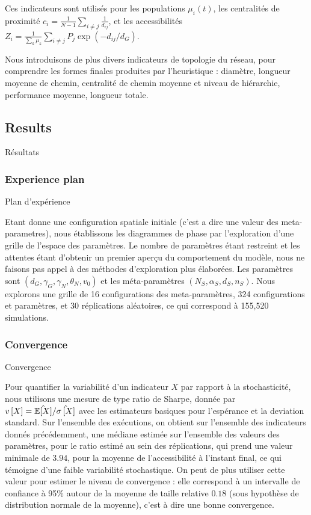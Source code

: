 Ces indicateurs sont utilisés pour les populations $\mu_i(t)$, les centralités de proximité $c_i = \frac{1}{N-1}\sum_{i\neq j} \frac{1}{d_{ij}}$, et les accessibilités $Z_i = \frac{1}{\sum_k \mu_k}\sum_{i\neq j} P_j \exp{\left(- d_{ij}/d_G\right)}$.



Nous introduisons de plus divers indicateurs de topologie du réseau, pour comprendre les formes finales produites par l'heuristique : diamètre, longueur moyenne de chemin, centralité de chemin moyenne et niveau de hiérarchie, performance moyenne, longueur totale.




\subsection{Results}{Résultats}


\subsubsection{Experience plan}{Plan d'expérience}

Etant donne une configuration spatiale initiale (c'est a dire une valeur des meta-parametres), nous établissons les diagrammes de phase par l'exploration d'une grille de l'espace des paramètres. Le nombre de paramètres étant restreint et les attentes étant d'obtenir un premier aperçu du comportement du modèle, nous ne faisons pas appel à des méthodes d'exploration plus élaborées. Les paramètres sont $(d_G,\gamma_G,\gamma_N,\theta_N,v_0)$ et les méta-paramètres $(N_S,\alpha_S,d_S,n_S)$. Nous explorons une grille de 16 configurations des meta-paramètres, 324 configurations et paramètres, et 30 réplications aléatoires, ce qui correspond à 155,520 simulations.



\subsubsection{Convergence}{Convergence}


Pour quantifier la variabilité d'un indicateur $X$ par rapport à la stochasticité, nous utilisons une mesure de type ratio de Sharpe, donnée par $v\left[X\right] = \hat{\operatorname{\mathbb{E}}\!\left[X\right]}/\hat{\sigma\left[X\right]}$ avec les estimateurs basiques pour l'espérance et la deviation standard. Sur l'ensemble des exécutions, on obtient sur l'ensemble des indicateurs donnés précédemment, une médiane estimée sur l'ensemble des valeurs des paramètres, pour le ratio estimé au sein des réplications, qui prend une valeur minimale de $3.94$, pour la moyenne de l'accessibilité à l'instant final, ce qui témoigne d'une faible variabilité stochastique. On peut de plus utiliser cette valeur pour estimer le niveau de convergence : elle correspond à un intervalle de confiance à 95\% autour de la moyenne de taille relative $0.18$ (sous hypothèse de distribution normale de la moyenne), c'est à dire une bonne convergence.


